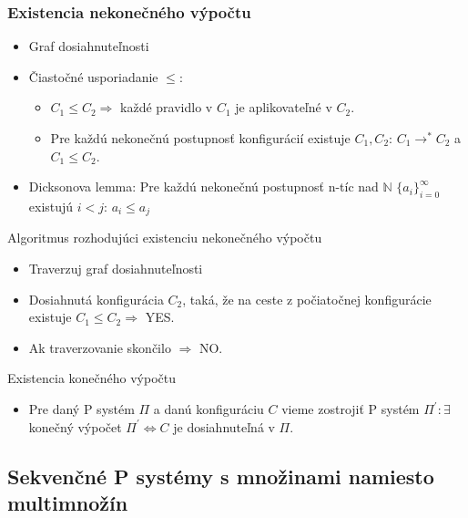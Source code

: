 \begin{frame}[t]\frametitle{Existencia nekonečného výpočtu}
  \begin{itemize}
    \item Graf dosiahnuteľnosti
    \pause
    \item Čiastočné usporiadanie $\leq$:
    \begin{itemize}
      \item $C_1 \leq C_2 \Rightarrow$ každé pravidlo v $C_1$ je aplikovateľné v $C_2$.
      \pause
      \item Pre každú nekonečnú postupnosť konfigurácií existuje $C_1, C_2$: $C_1 \rightarrow^* C_2$ a $C_1 \leq C_2$.
    \end{itemize}
    \pause
    \item Dicksonova lemma: Pre každú nekonečnú postupnosť n-tíc nad $\mathbb{N}$ $\{a_i\}_{i=0}^\infty$ existujú $i<j$: $a_i\leq a_j$
  \end{itemize}
\end{frame}

\begin{frame}[t]{Algoritmus rozhodujúci existenciu nekonečného výpočtu}
  \begin{itemize}
    \item Traverzuj graf dosiahnuteľnosti
    \item Dosiahnutá konfigurácia $C_2$, taká, že na ceste z počiatočnej konfigurácie existuje $C_1\leq C_2\Rightarrow$ YES.
    \item Ak traverzovanie skončilo $\Rightarrow$ NO.
  \end{itemize}
\end{frame}

\begin{frame}[t]{Existencia konečného výpočtu}
  \begin{itemize}
    \item Pre daný P systém $\Pi$ a danú konfiguráciu $C$ vieme zostrojiť P systém $\Pi^\prime: \exists$ konečný výpočet $\Pi^\prime\Leftrightarrow C$ je dosiahnuteľná v $\Pi$.  
  \end{itemize}  
\end{frame}


\subsection{Sekvenčné P systémy s množinami namiesto multimnožín} %
\label{sub:sekven_n_p_syst_my_s_mno_inami_namiesto_multimno_n}

